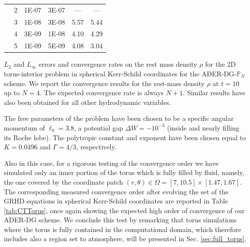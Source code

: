\begin{margintable}
{\begin{tabular}{ c r  cccc  }
			\cline{2-6}
			\hline
			\multirow{4}{*}{\rotatebox{90}{{DG-$\mathbb{P}_4$}}}
			&2	&   1E-07	& 3E-07	 	&  ---	&  ---	\\  %
			&3	&   1E-08	& 3E-08	 	& 5.57	& 5.44 \\ 	%
			&4	&   3E-09	& 1E-08	 	& 4.10	& 4.29	\\  %
			&5	&   1E-09	& 5E-09	 	& 4.08	& 3.04	\\  %
			\cline{2-6}
			\hline	
		\end{tabular}
	} %
	\caption[
	Convergence table for 2D spherical Kerr-Schild torus
	]{  $L_2$ and $L_\infty$ errors and
		convergence rates on the rest mass density $\rho$
		for the 2D torus-interior problem in spherical Kerr-Schild
		coordinates for the ADER-DG-$\mathbb{P}_N$ scheme. We report the
		convergence results for the rest-mass density $\rho$ at $t=10$ up to
		$N=4$. The expected convergence rate is always $N+1$. Similar
		results have also been obtained for all other hydrodynamic variables. } 
	\label{tab:CTTorus}
\end{margintable}

The free parameters of the problem have been chosen to be a specific
angular momentum of $\ell_0 = 3.8$, a potential gap $\Delta W = -
10^{-3}$ (inside and nearly filling its {Roche lobe}). The polytropic
constant and exponent have been chosen equal to $K=0.0496$ and
$\Gamma=4/3$, respectively.

Also in this case, for a rigorous testing of the convergence order we
have simulated only an inner portion of the torus which is fully filled
by fluid, namely, the one covered by the coordinate patch
$(r,\theta)\in\Omega=[7,10.5]\times[1.47,1.67]$. The corresponding
measured convergence order after evolving the set of the GRHD equations
in spherical Kerr-Schild coordinates are reported in Table \ref{tab:CTTorus}, once
again showing the expected high order of convergence of our ADER-DG
scheme. We conclude this test by remarking that torus simulations where
the torus is fully contained in the computational domain, which therefore
includes also a region set to {atmosphere}, will be presented in
Sec. \ref{sec:full_torus}.

